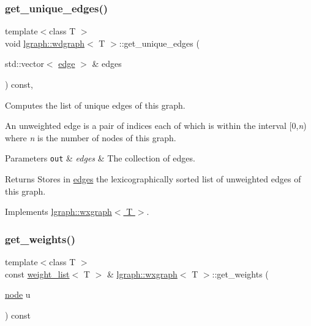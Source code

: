 \subsubsection{\texorpdfstring{get\+\_\+unique\+\_\+edges()}{get\_unique\_edges()}\hspace{0.1cm}{\footnotesize\ttfamily [2/2]}}
{\footnotesize\ttfamily template$<$class T $>$ \\
void \hyperlink{classlgraph_1_1wdgraph}{lgraph\+::wdgraph}$<$ T $>$\+::get\+\_\+unique\+\_\+edges (\begin{DoxyParamCaption}\item[{std\+::vector$<$ \hyperlink{namespacelgraph_a76bd7d50719f03de7a85db259d80d572}{edge} $>$ \&}]{edges }\end{DoxyParamCaption}) const\hspace{0.3cm}{\ttfamily [protected]}, {\ttfamily [virtual]}}



Computes the list of unique edges of this graph. 

An unweighted edge is a pair of indices each of which is within the interval \mbox{[}0,{\itshape n}) where {\itshape n} is the number of nodes of this graph.


\begin{DoxyParams}[1]{Parameters}
\mbox{\tt out}  & {\em edges} & The collection of edges. \\
\hline
\end{DoxyParams}
\begin{DoxyReturn}{Returns}
Stores in \hyperlink{classlgraph_1_1wxgraph_a1b89f56544185e33d54e72a8ed19a789}{edges} the lexicographically sorted list of unweighted edges of this graph. 
\end{DoxyReturn}


Implements \hyperlink{classlgraph_1_1wxgraph_a6c1de8061b1606071320a01dd1b5fe64}{lgraph\+::wxgraph$<$ T $>$}.

\mbox{\label{classlgraph_1_1wxgraph_a468406b24e0d61a96b7106b845c5c718}} 
\subsubsection{\texorpdfstring{get\+\_\+weights()}{get\_weights()}\hspace{0.1cm}{\footnotesize\ttfamily [1/2]}}
{\footnotesize\ttfamily template$<$class T $>$ \\
const \hyperlink{namespacelgraph_a1e0fd5ef0a78b2a92da48adbed265cb6}{weight\+\_\+list}$<$ T $>$ \& \hyperlink{classlgraph_1_1wxgraph}{lgraph\+::wxgraph}$<$ T $>$\+::get\+\_\+weights (\begin{DoxyParamCaption}\item[{\hyperlink{namespacelgraph_a397169dd66adf725210a30fb7251773e}{node}}]{u }\end{DoxyParamCaption}) const\hspace{0.3cm}{\ttfamily [inherited]}}



